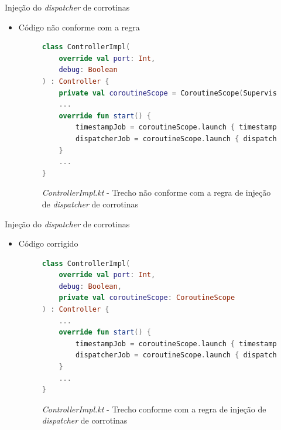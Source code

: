 \documentclass[brazilian]{beamer}
\begin{document}
\begin{frame}[fragile]{Injeção do \textit{dispatcher} de corrotinas}
    \begin{itemize}
        \item Código não conforme com a regra
        \begin{figure}[H]
            \centering
            \begin{lstlisting}[language=Kotlin]
class ControllerImpl(
    override val port: Int,
    debug: Boolean
) : Controller {
    private val coroutineScope = CoroutineScope(SupervisorJob() + Dispatchers.IO)
    ...
    override fun start() {
        timestampJob = coroutineScope.launch { timestampRepository.run() }
        dispatcherJob = coroutineScope.launch { dispatcher.run() }
    }
    ...
}
            \end{lstlisting}
            \caption{\textit{ControllerImpl.kt} - Trecho não conforme com a regra de injeção de \textit{dispatcher} de corrotinas}
            \label{fig:detekt_inject_dispatcher_before_example}
        \end{figure}
    \end{itemize}
\end{frame}

\begin{frame}[fragile]{Injeção do \textit{dispatcher} de corrotinas}
    \begin{itemize}
        \item Código corrigido
        \begin{figure}[H]
    \centering
    \begin{lstlisting}[language=Kotlin]
class ControllerImpl(
    override val port: Int,
    debug: Boolean,
    private val coroutineScope: CoroutineScope
) : Controller {
    ...
    override fun start() {
        timestampJob = coroutineScope.launch { timestampRepository.run() }
        dispatcherJob = coroutineScope.launch { dispatcher.run() }
    }
    ...
}
    \end{lstlisting}
    \caption{\textit{ControllerImpl.kt} - Trecho conforme com a regra de injeção de \textit{dispatcher} de corrotinas}
    \label{fig:detekt_inject_dispatcher_after_example}
\end{figure}
    \end{itemize}
\end{frame}
\end{document}
